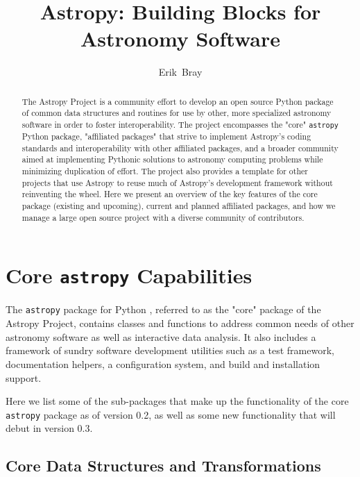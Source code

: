 \documentclass[11pt,twoside]{article}
\begin{document}
\title{Astropy: Building Blocks for Astronomy Software}

\author{Erik~Bray
}

\begin{abstract}
The Astropy Project is a community effort to develop an open source Python
package of common data structures and routines for use by other, more
specialized astronomy software in order to foster interoperability.
The project encompasses the "core" \texttt{astropy} Python package, "affiliated
packages" that strive to implement Astropy's coding standards and
interoperability with other affiliated packages, and a broader community aimed
at implementing Pythonic solutions to astronomy computing problems while
minimizing duplication of effort.  The project also provides a template for
other projects that use Astropy to reuse much of Astropy's development
framework without reinventing the wheel.
Here we present an overview of the key features of the core package (existing
and upcoming), current and planned affiliated packages, and how we manage a
large open source project with a diverse community of contributors.
\end{abstract}

\section{Core \texttt{astropy} Capabilities}

The \texttt{astropy} package for Python \citep{2013arXiv1307.6212T}, referred
to as the "core" package of the Astropy Project, contains classes and functions
to address common needs of other astronomy software as well as interactive data
analysis.  It also includes a framework of sundry software development
utilities such as a test framework, documentation helpers, a configuration
system, and build and installation support.

Here we list some of the sub-packages that make up the functionality of the
core \texttt{astropy} package as of version 0.2, as well as some new
functionality that will debut in version 0.3.

\subsection{Core Data Structures and Transformations}

\end{document}

